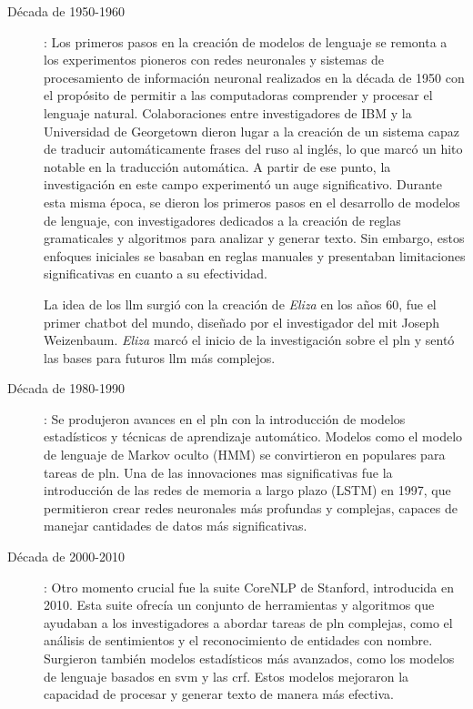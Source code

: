 \begin{description}

\item[Década de 1950-1960]: Los primeros pasos en la creación de modelos de lenguaje se remonta a los experimentos pioneros con redes neuronales y sistemas de procesamiento de información neuronal realizados en la década de 1950 con el propósito de permitir a las computadoras comprender y procesar el lenguaje natural. Colaboraciones entre investigadores de IBM y la Universidad de Georgetown dieron lugar a la creación de un sistema capaz de traducir automáticamente frases del ruso al inglés, lo que marcó un hito notable en la traducción automática. A partir de ese punto, la investigación en este campo experimentó un auge significativo. Durante esta misma época, se dieron los primeros pasos en el desarrollo de modelos de lenguaje, con investigadores dedicados a la creación de reglas gramaticales y algoritmos para analizar y generar texto. Sin embargo, estos enfoques iniciales se basaban en reglas manuales y presentaban limitaciones significativas en cuanto a su efectividad.

La idea de los \acrshort{llm} surgió con la creación de \textit{Eliza} en los años 60, fue el primer chatbot del mundo, diseñado por el investigador del \acrshort{mit} Joseph Weizenbaum. \textit{Eliza} marcó el inicio de la investigación sobre el \acrfull{pln} y sentó las bases para futuros \acrshort{llm} más complejos.

\item[Década de 1980-1990]: Se produjeron avances en el \acrfull{pln} con la introducción de modelos estadísticos y técnicas de aprendizaje automático. Modelos como el modelo de lenguaje de Markov oculto (HMM) se convirtieron en populares para tareas de \acrshort{pln}. Una de las innovaciones mas significativas fue la introducción de las redes de memoria a largo plazo (LSTM) en 1997, que permitieron crear redes neuronales más profundas y complejas, capaces de manejar cantidades de datos más significativas.

\item[Década de 2000-2010]: Otro momento crucial fue la suite CoreNLP de Stanford, introducida en 2010. Esta suite ofrecía un conjunto de herramientas y algoritmos que ayudaban a los investigadores a abordar tareas de \acrshort{pln} complejas, como el análisis de sentimientos y el reconocimiento de entidades con nombre. Surgieron también modelos estadísticos más avanzados, como los modelos de lenguaje basados en \acrfull{svm} y las \acrfull{crf}. Estos modelos mejoraron la capacidad de procesar y generar texto de manera más efectiva.


\end{description}
